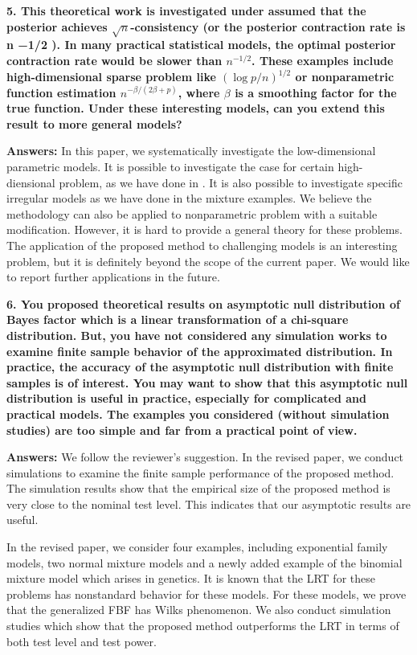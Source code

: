 \documentclass[11pt]{article}
\theoremstyle{plain}
\theoremstyle{definition}
\theoremstyle{remark}
\begin{document}
\textbf{
    5. This theoretical work is investigated under assumed that the posterior achieves $\sqrt n$-consistency (or the posterior contraction rate is n −1/2 ).
    In many practical statistical models, the optimal posterior contraction rate would be slower than $n^{-1/2}$.
    These examples include high-dimensional sparse problem like $(\log p /n)^{1/2}$ or nonparametric function estimation $n^{-\beta / (2\beta + p)}$, where $\beta$ is a smoothing factor for the true function.
    Under these interesting models, can you extend this result to more general models?
}

\textbf{Answers:}
In this paper, we systematically investigate the low-dimensional parametric models.
It is possible to investigate the case for certain high-diensional problem, as we have done in \cite{Wang2020}.
It is also possible to investigate specific irregular models as we have done in the mixture examples.
We believe the methodology can also be applied to nonparametric problem with a suitable modification.
However, it is hard to provide a general theory for these problems.
The application of the proposed method to challenging models is an interesting problem, but it is definitely beyond the scope of the current paper.
We would like to report further applications in the future.

\textbf{
    6. You proposed theoretical results on asymptotic null distribution of Bayes factor which is a linear transformation of a chi-square distribution.
    But, you have not considered any simulation works to examine finite sample behavior of the approximated distribution.
    In practice, the accuracy of the asymptotic null distribution with finite samples is of interest.
    You may want to show that this asymptotic null distribution is useful in practice, especially for complicated and practical models.
    The examples you considered (without simulation studies) are too simple and far from a practical point of view.
}

\textbf{Answers:}
We follow the reviewer's suggestion.
In the revised paper, we conduct simulations to examine the finite sample performance of the proposed method.
The simulation results show that the empirical size of the proposed method is very close to the nominal test level.
This indicates that our asymptotic results are useful.

In the revised paper, we consider four examples, including exponential family models, two normal mixture models and a newly added example of the binomial mixture model which arises in genetics.
It is known that the LRT for these problems has nonstandard behavior for these models.
For these models, we prove that the generalized FBF has Wilks phenomenon.
We also conduct simulation studies which show that the proposed method outperforms the LRT in terms of both test level and test power.
\end{document}
